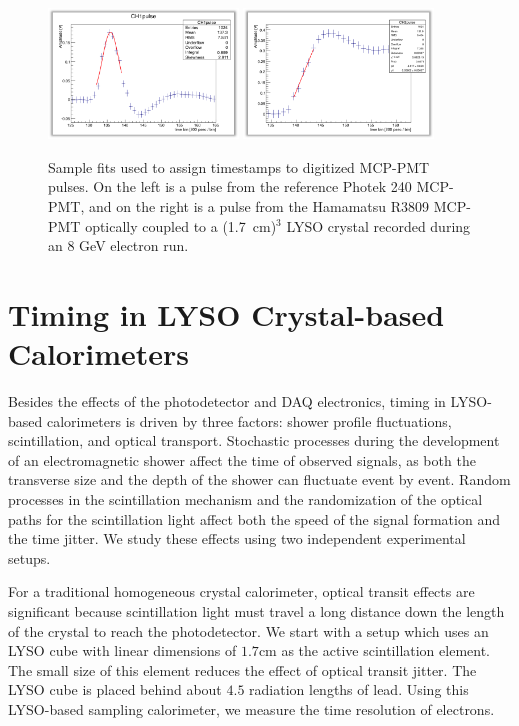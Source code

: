 \documentclass[12pt]{article}
\begin{document}
{\begin{figure}[h] \centering
\includegraphics[width=0.45\textwidth]{figs/RefPulseFit} 
\includegraphics[width=0.45\textwidth]{figs/ScintPulseFit} 
\caption{Sample fits used to assign timestamps to digitized MCP-PMT pulses. 
On the left is a pulse from the reference Photek 240 MCP-PMT, and
on the right is a pulse from the Hamamatsu R3809 MCP-PMT
optically coupled to a (1.7~cm)$^{3}$  LYSO crystal
recorded during an 8 GeV electron run.}
\label{fig:PulseFits}
\end{figure}


\section{Timing in LYSO Crystal-based Calorimeters}

Besides the effects of the photodetector and DAQ electronics, timing in
LYSO-based calorimeters is driven by three factors: shower profile fluctuations,
scintillation, and optical transport. Stochastic processes during the
development of an electromagnetic shower affect the time of observed signals, as
both the transverse size and the depth of the shower can fluctuate event by
event. Random processes in the scintillation mechanism and the randomization of
the optical paths for the scintillation light affect both the speed of the
signal formation and the time jitter. We study these effects using two
independent experimental setups. 

For a traditional homogeneous crystal calorimeter, optical transit effects are
significant because scintillation light must travel a long distance down the
length of the crystal to reach the photodetector. We start with a setup which
uses an LYSO cube with linear dimensions of $1.7\mathrm{cm}$ as the active
scintillation element. The small size of this element reduces the effect of
optical transit jitter. The LYSO cube is placed behind about $4.5$ radiation
lengths of lead. Using this LYSO-based sampling calorimeter, we measure the time
resolution of electrons.

}
\end{document}
